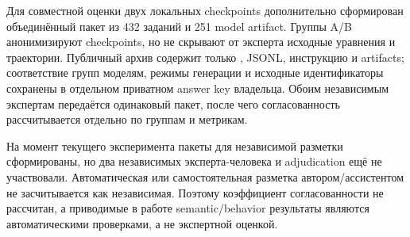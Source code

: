 Для совместной оценки двух локальных checkpoints дополнительно сформирован объединённый пакет из 432 заданий и 251 model artifact. Группы A/B анонимизируют checkpoints, но не скрывают от эксперта исходные уравнения и траектории. Публичный архив содержит только , JSONL, инструкцию и artifacts; соответствие групп моделям, режимы генерации и исходные идентификаторы сохранены в отдельном приватном answer key владельца. Обоим независимым экспертам передаётся одинаковый пакет, после чего согласованность рассчитывается отдельно по группам и метрикам.

На момент текущего эксперимента пакеты для независимой разметки сформированы, но два независимых эксперта-человека и adjudication ещё не участвовали. Автоматическая или самостоятельная разметка автором/ассистентом не засчитывается как независимая. Поэтому коэффициент согласованности не рассчитан, а приводимые в работе semantic/behavior результаты являются автоматическими проверками, а не экспертной оценкой.
